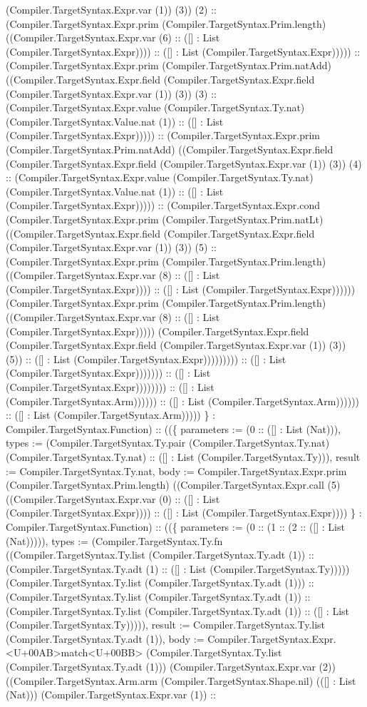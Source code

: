 \documentclass[11pt]{article}
\begin{document}
(Compiler.TargetSyntax.Expr.var (1)) (3)) (2) :: (Compiler.TargetSyntax.Expr.prim (Compiler.TargetSyntax.Prim.length) ((Compiler.TargetSyntax.Expr.var (6) :: ([] : List (Compiler.TargetSyntax.Expr)))) :: ([] : List (Compiler.TargetSyntax.Expr))))) :: (Compiler.TargetSyntax.Expr.prim (Compiler.TargetSyntax.Prim.natAdd) ((Compiler.TargetSyntax.Expr.field (Compiler.TargetSyntax.Expr.field (Compiler.TargetSyntax.Expr.var (1)) (3)) (3) :: (Compiler.TargetSyntax.Expr.value (Compiler.TargetSyntax.Ty.nat) (Compiler.TargetSyntax.Value.nat (1)) :: ([] : List (Compiler.TargetSyntax.Expr))))) :: (Compiler.TargetSyntax.Expr.prim (Compiler.TargetSyntax.Prim.natAdd) ((Compiler.TargetSyntax.Expr.field (Compiler.TargetSyntax.Expr.field (Compiler.TargetSyntax.Expr.var (1)) (3)) (4) :: (Compiler.TargetSyntax.Expr.value (Compiler.TargetSyntax.Ty.nat) (Compiler.TargetSyntax.Value.nat (1)) :: ([] : List (Compiler.TargetSyntax.Expr))))) :: (Compiler.TargetSyntax.Expr.cond (Compiler.TargetSyntax.Expr.prim (Compiler.TargetSyntax.Prim.natLt) ((Compiler.TargetSyntax.Expr.field (Compiler.TargetSyntax.Expr.field (Compiler.TargetSyntax.Expr.var (1)) (3)) (5) :: (Compiler.TargetSyntax.Expr.prim (Compiler.TargetSyntax.Prim.length) ((Compiler.TargetSyntax.Expr.var (8) :: ([] : List (Compiler.TargetSyntax.Expr)))) :: ([] : List (Compiler.TargetSyntax.Expr)))))) (Compiler.TargetSyntax.Expr.prim (Compiler.TargetSyntax.Prim.length) ((Compiler.TargetSyntax.Expr.var (8) :: ([] : List (Compiler.TargetSyntax.Expr))))) (Compiler.TargetSyntax.Expr.field (Compiler.TargetSyntax.Expr.field (Compiler.TargetSyntax.Expr.var (1)) (3)) (5)) :: ([] : List (Compiler.TargetSyntax.Expr))))))))) :: ([] : List (Compiler.TargetSyntax.Expr))))))) :: ([] : List (Compiler.TargetSyntax.Expr)))))))) :: ([] : List (Compiler.TargetSyntax.Arm)))))) :: ([] : List (Compiler.TargetSyntax.Arm)))))) :: ([] : List (Compiler.TargetSyntax.Arm))))) \} : Compiler.TargetSyntax.Function) :: ((\{ parameters := (0 :: ([] : List (Nat))), types := (Compiler.TargetSyntax.Ty.pair (Compiler.TargetSyntax.Ty.nat) (Compiler.TargetSyntax.Ty.nat) :: ([] : List (Compiler.TargetSyntax.Ty))), result := Compiler.TargetSyntax.Ty.nat, body := Compiler.TargetSyntax.Expr.prim (Compiler.TargetSyntax.Prim.length) ((Compiler.TargetSyntax.Expr.call (5) ((Compiler.TargetSyntax.Expr.var (0) :: ([] : List (Compiler.TargetSyntax.Expr)))) :: ([] : List (Compiler.TargetSyntax.Expr)))) \} : Compiler.TargetSyntax.Function) :: ((\{ parameters := (0 :: (1 :: (2 :: ([] : List (Nat))))), types := (Compiler.TargetSyntax.Ty.fn ((Compiler.TargetSyntax.Ty.list (Compiler.TargetSyntax.Ty.adt (1)) :: (Compiler.TargetSyntax.Ty.adt (1) :: ([] : List (Compiler.TargetSyntax.Ty))))) (Compiler.TargetSyntax.Ty.list (Compiler.TargetSyntax.Ty.adt (1))) :: (Compiler.TargetSyntax.Ty.list (Compiler.TargetSyntax.Ty.adt (1)) :: (Compiler.TargetSyntax.Ty.list (Compiler.TargetSyntax.Ty.adt (1)) :: ([] : List (Compiler.TargetSyntax.Ty))))), result := Compiler.TargetSyntax.Ty.list (Compiler.TargetSyntax.Ty.adt (1)), body := Compiler.TargetSyntax.Expr.<U+00AB>match<U+00BB> (Compiler.TargetSyntax.Ty.list (Compiler.TargetSyntax.Ty.adt (1))) (Compiler.TargetSyntax.Expr.var (2)) ((Compiler.TargetSyntax.Arm.arm (Compiler.TargetSyntax.Shape.nil) (([] : List (Nat))) (Compiler.TargetSyntax.Expr.var (1)) :: 
\end{document}
